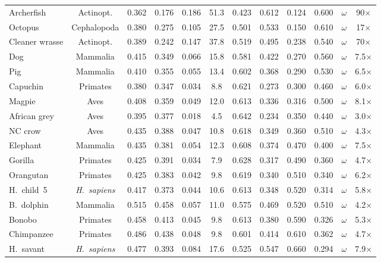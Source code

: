 \documentclass[
  aps,
  prd,
  twocolumn,
  superscriptaddress,
  nofootinbib,
  floatfix
]{revtex4-2}
\begin{document}
\begin{table}[t]
\begin{ruledtabular}
\begin{tabular}{lccccccccccc}
Archerfish & Actinopt. & 0.362 & 0.176 & 0.186 & 51.3
  & 0.423 & 0.612 & 0.124 & 0.600 & $\omega$ & 90$\times$ \\
Octopus & Cephalopoda & 0.380 & 0.275 & 0.105 & 27.5
  & 0.501 & 0.533 & 0.150 & 0.610 & $\omega$ & 17$\times$ \\
Cleaner wrasse & Actinopt. & 0.389 & 0.242 & 0.147 & 37.8
  & 0.519 & 0.495 & 0.238 & 0.540 & $\omega$ & 70$\times$ \\
Dog & Mammalia & 0.415 & 0.349 & 0.066 & 15.8
  & 0.581 & 0.422 & 0.270 & 0.560 & $\omega$ & 7.5$\times$ \\
Pig & Mammalia & 0.410 & 0.355 & 0.055 & 13.4
  & 0.602 & 0.368 & 0.290 & 0.530 & $\omega$ & 6.5$\times$ \\
Capuchin & Primates & 0.380 & 0.347 & 0.034 & 8.8
  & 0.621 & 0.273 & 0.300 & 0.460 & $\omega$ & 6.0$\times$ \\
Magpie & Aves & 0.408 & 0.359 & 0.049 & 12.0
  & 0.613 & 0.336 & 0.316 & 0.500 & $\omega$ & 8.1$\times$ \\
African grey & Aves & 0.395 & 0.377 & 0.018 & 4.5
  & 0.642 & 0.234 & 0.350 & 0.440 & $\omega$ & 3.0$\times$ \\
NC crow & Aves & 0.435 & 0.388 & 0.047 & 10.8
  & 0.618 & 0.349 & 0.360 & 0.510 & $\omega$ & 4.3$\times$ \\
Elephant & Mammalia & 0.435 & 0.381 & 0.054 & 12.3
  & 0.608 & 0.374 & 0.470 & 0.400 & $\omega$ & 7.5$\times$ \\
Gorilla & Primates & 0.425 & 0.391 & 0.034 & 7.9
  & 0.628 & 0.317 & 0.490 & 0.360 & $\omega$ & 4.7$\times$ \\
Orangutan & Primates & 0.425 & 0.383 & 0.042 & 9.8
  & 0.619 & 0.340 & 0.510 & 0.340 & $\omega$ & 6.2$\times$ \\
H.~child~5 & \textit{H.~sapiens} & 0.417 & 0.373 & 0.044
  & 10.6 & 0.613 & 0.348 & 0.520 & 0.314 & $\omega$ & 5.8$\times$ \\
B.~dolphin & Mammalia & 0.515 & 0.458 & 0.057 & 11.0
  & 0.575 & 0.469 & 0.520 & 0.510 & $\omega$ & 4.2$\times$ \\
Bonobo & Primates & 0.458 & 0.413 & 0.045 & 9.8
  & 0.613 & 0.380 & 0.590 & 0.326 & $\omega$ & 5.3$\times$ \\
Chimpanzee & Primates & 0.486 & 0.438 & 0.048 & 9.8
  & 0.601 & 0.414 & 0.610 & 0.362 & $\omega$ & 4.7$\times$ \\
H.~savant & \textit{H.~sapiens} & 0.477 & 0.393 & 0.084
  & 17.6 & 0.525 & 0.547 & 0.660 & 0.294 & $\omega$ & 7.9$\times$ \\

\end{tabular}
\end{ruledtabular}
\end{table}
\end{document}
